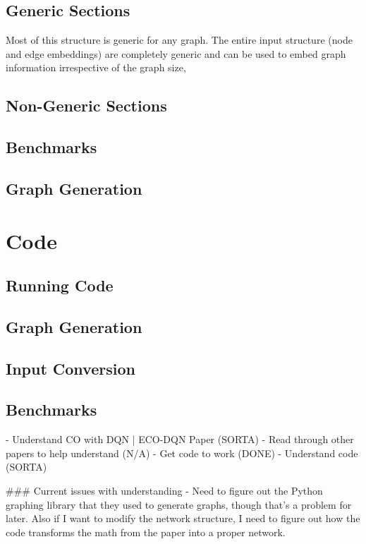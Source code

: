 \documentclass{article}
\begin{document}
\subsection{Generic Sections}

Most of this structure is generic for any graph. The entire input structure (node and edge embeddings) are completely generic and can be used to embed graph information irrespective of the graph size, 

\subsection{Non-Generic Sections}

\subsection{Benchmarks}

\subsection{Graph Generation}


\section{Code}

\subsection{Running Code}

\subsection{Graph Generation}

\subsection{Input Conversion}

\subsection{Benchmarks}

- Understand CO with DQN | ECO-DQN Paper (SORTA)
	- Read through other papers to help understand (N/A)
	- Get code to work (DONE)
		- Understand code (SORTA)

### Current issues with understanding
- Need to figure out the Python graphing library that they used to generate graphs, though that's a problem for later. Also if I want to modify the network structure, I need to figure out how the code transforms the math from the paper into a proper network.
\end{document}
